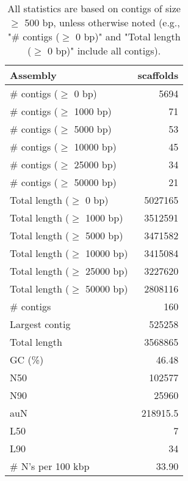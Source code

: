 \documentclass[12pt,a4paper]{article}
\begin{document}
\begin{table}[ht]
\begin{center}
\caption{All statistics are based on contigs of size $\geq$ 500 bp, unless otherwise noted (e.g., "\# contigs ($\geq$ 0 bp)" and "Total length ($\geq$ 0 bp)" include all contigs).}
\begin{tabular}{|l*{1}{|r}|}
\hline
Assembly & scaffolds \\ \hline
\# contigs ($\geq$ 0 bp) & 5694 \\ \hline
\# contigs ($\geq$ 1000 bp) & 71 \\ \hline
\# contigs ($\geq$ 5000 bp) & 53 \\ \hline
\# contigs ($\geq$ 10000 bp) & 45 \\ \hline
\# contigs ($\geq$ 25000 bp) & 34 \\ \hline
\# contigs ($\geq$ 50000 bp) & 21 \\ \hline
Total length ($\geq$ 0 bp) & 5027165 \\ \hline
Total length ($\geq$ 1000 bp) & 3512591 \\ \hline
Total length ($\geq$ 5000 bp) & 3471582 \\ \hline
Total length ($\geq$ 10000 bp) & 3415084 \\ \hline
Total length ($\geq$ 25000 bp) & 3227620 \\ \hline
Total length ($\geq$ 50000 bp) & 2808116 \\ \hline
\# contigs & 160 \\ \hline
Largest contig & 525258 \\ \hline
Total length & 3568865 \\ \hline
GC (\%) & 46.48 \\ \hline
N50 & 102577 \\ \hline
N90 & 25960 \\ \hline
auN & 218915.5 \\ \hline
L50 & 7 \\ \hline
L90 & 34 \\ \hline
\# N's per 100 kbp & 33.90 \\ \hline
\end{tabular}
\end{center}
\end{table}
\end{document}

